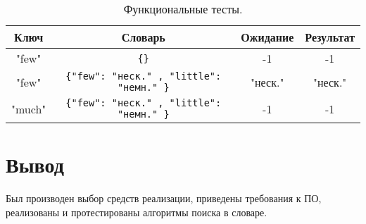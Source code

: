 \begin{table}[h!]
	\begin{center}
		\begin{tabular}{|c | c | c | c |}
			\hline
			Ключ & Словарь & Ожидание & Результат \\
			\hline
			"few" & \texttt{\{\}} & -1 & -1 \\
			"few" & \texttt{\{"few": "неск."\,, "little": "немн." \}} & "неск." & "неск." \\
			"much" & \texttt{\{"few": "неск."\,, "little": "немн." \}} & -1 & -1 \\
			\hline
		\end{tabular}
	\end{center}
	\caption{\label{tab:test_rec} Функциональные тесты.}
\end{table}



\section*{Вывод}

Был производен выбор средств реализации, приведены требования к ПО, реализованы и протестированы алгоритмы поиска в словаре.
